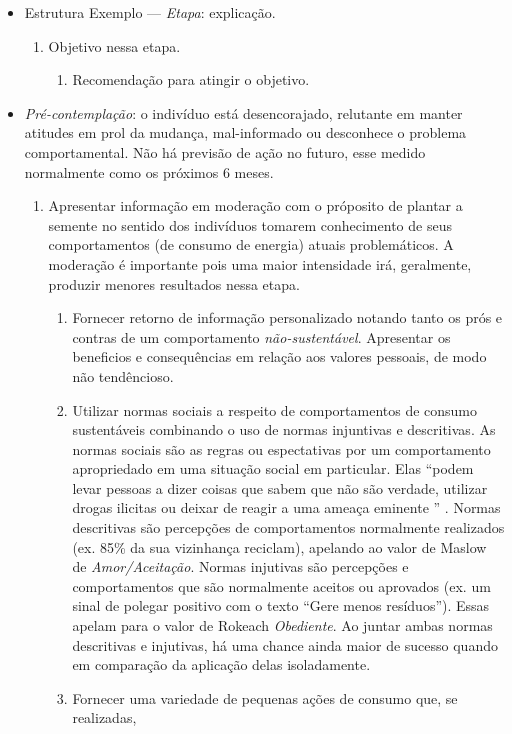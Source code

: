 \begin{itemize}
\item Estrutura Exemplo --- \emph{Etapa}: explicação.
\begin{enumerate}
\item Objetivo nessa etapa.
\begin{enumerate}
\item Recomendação para atingir o objetivo.
\end{enumerate}
\end{enumerate}
\item \emph{Pré-contemplação}: o indivíduo está desencorajado,
relutante em manter atitudes em prol da mudança, mal-informado ou
desconhece o problema comportamental. Não há previsão de ação no
futuro, esse medido normalmente como os próximos 6 meses.
\begin{enumerate}
\item Apresentar informação em moderação com o próposito de plantar a
semente no sentido dos indivíduos tomarem conhecimento de seus
comportamentos (de consumo de energia) atuais problemáticos. A
moderação é importante pois uma maior intensidade irá, geralmente,
produzir menores resultados nessa etapa.
\begin{enumerate}
\item Fornecer retorno de informação personalizado notando tanto os
prós e contras de um comportamento \emph{não-sustentável}. Apresentar
os beneficios e consequências em relação aos valores pessoais, de modo
não tendêncioso.  
\item Utilizar normas sociais a respeito de comportamentos de consumo
sustentáveis combinando o uso de normas injuntivas e descritivas. As
normas sociais são as regras ou espectativas por um comportamento
apropriedado em uma situação social em particular. Elas ``podem levar
pessoas a dizer coisas que sabem que não são verdade, utilizar drogas
ilicitas ou deixar de reagir a uma ameaça eminente '' \cite[p.51,
tradução própria]{aceee_2010_estudos_feedback}.  Normas descritivas
são percepções de comportamentos normalmente realizados (ex. 85\% da
sua vizinhança reciclam), apelando ao valor de Maslow de
\emph{Amor/Aceitação}. Normas injutivas são percepções e
comportamentos que são normalmente aceitos ou aprovados (ex. um sinal
de polegar positivo com o texto ``Gere menos resíduos''). Essas apelam
para o valor de Rokeach \emph{Obediente}.  Ao juntar ambas normas
descritivas e injutivas, há uma chance ainda maior de sucesso quando
em comparação da aplicação delas isoladamente.
\item Fornecer uma variedade de pequenas ações de consumo que, se realizadas, 

\end{enumerate}
\end{enumerate}
\end{itemize}
